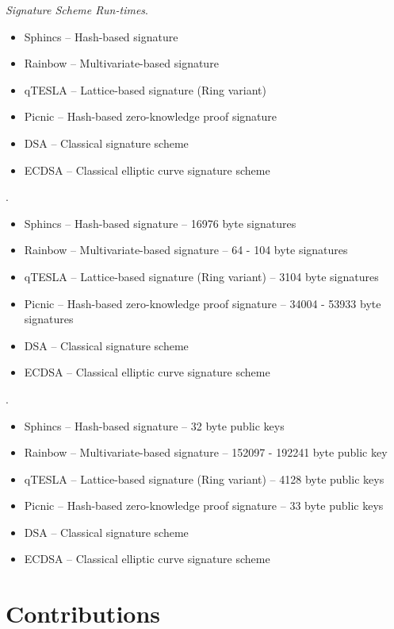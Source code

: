 \noindent
\textit{Signature Scheme Run-times}.

\begin{itemize}
\item Sphincs -- Hash-based signature
\item Rainbow -- Multivariate-based signature
\item qTESLA -- Lattice-based signature (Ring variant)
\item Picnic -- Hash-based zero-knowledge proof signature
\item DSA -- Classical signature scheme
\item ECDSA -- Classical elliptic curve signature scheme
\end{itemize}

\noindent
{}.

\begin{itemize}
\item Sphincs -- Hash-based signature -- 16976 byte signatures
\item Rainbow -- Multivariate-based signature -- 64 - 104 byte signatures
\item qTESLA -- Lattice-based signature (Ring variant) -- 3104 byte signatures
\item Picnic -- Hash-based zero-knowledge proof signature -- 34004 - 53933 byte signatures
\item DSA -- Classical signature scheme
\item ECDSA -- Classical elliptic curve signature scheme
\end{itemize}

\noindent
{}.

\begin{itemize}
\item Sphincs -- Hash-based signature -- 32 byte public keys
\item Rainbow -- Multivariate-based signature -- 152097 - 192241 byte public key
\item qTESLA -- Lattice-based signature (Ring variant) -- 4128 byte public keys
\item Picnic -- Hash-based zero-knowledge proof signature -- 33 byte public keys
\item DSA -- Classical signature scheme
\item ECDSA -- Classical elliptic curve signature scheme
\end{itemize}

\section{Contributions}

